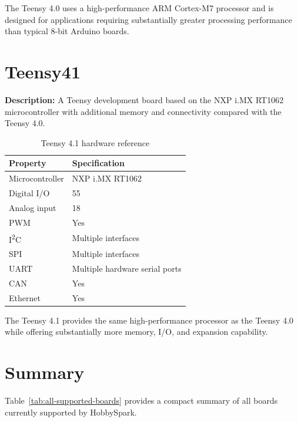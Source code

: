 The Teensy 4.0 uses a high-performance ARM Cortex-M7 processor and is
designed for applications requiring substantially greater processing
performance than typical 8-bit Arduino boards.

\newpage
\section{Teensy41}

\textbf{Description:} A Teensy development board based on the NXP i.MX RT1062
microcontroller with additional memory and connectivity compared with the
Teensy 4.0.

\begin{table}[H]
\centering
\caption{Teensy 4.1 hardware reference}
\label{tab:board-teensy41}
\begin{tabular}{ll}
\toprule
\textbf{Property} & \textbf{Specification} \\
\midrule
Microcontroller & NXP i.MX RT1062 \\
Digital I/O & 55 \\
Analog input & 18 \\
PWM & Yes \\
I\textsuperscript{2}C & Multiple interfaces \\
SPI & Multiple interfaces \\
UART & Multiple hardware serial ports \\
CAN & Yes \\
Ethernet & Yes \\
\bottomrule
\end{tabular}
\end{table}

The Teensy 4.1 provides the same high-performance processor as the Teensy
4.0 while offering substantially more memory, I/O, and expansion capability.

\newpage
\section{Summary}

Table~\ref{tab:all-supported-boards} provides a compact summary of all
boards currently supported by HobbySpark.

